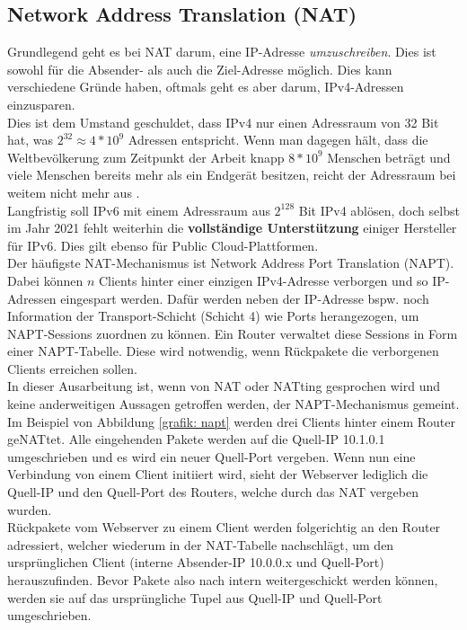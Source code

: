 \subsection{Network Address Translation (NAT)}
Grundlegend geht es bei \gls{NAT} darum, eine IP-Adresse \textit{umzuschreiben}. Dies ist sowohl für die Absender- als auch die Ziel-Adresse möglich. Dies kann verschiedene Gründe haben, oftmals geht es aber darum, IPv4-Adressen einzusparen.\\
Dies ist dem Umstand geschuldet, dass IPv4 nur einen Adressraum von 32 Bit hat, was $2^{32} \approx 4*10^9$ Adressen entspricht. Wenn man dagegen hält, dass die Weltbevölkerung zum Zeitpunkt der Arbeit knapp $8*10^9$ Menschen beträgt und viele Menschen bereits mehr als ein Endgerät besitzen, reicht der Adressraum bei weitem nicht mehr aus \cite{weltbevoelkerung2020dsw}.\\
Langfristig soll IPv6 mit einem Adressraum aus $2^{128}$ Bit IPv4 ablösen, doch selbst im Jahr 2021 fehlt weiterhin die \textbf{vollständige Unterstützung} einiger Hersteller für IPv6. Dies gilt ebenso für Public Cloud-Plattformen.\\
Der häufigste \gls{NAT}-Mechanismus ist Network Address Port Translation (NAPT). Dabei können $n$ \gls{Client}s hinter einer einzigen IPv4-Adresse \glqq verborgen\grqq{} und so IP-Adressen eingespart werden. Dafür werden neben der IP-Adresse bspw. noch Information der Transport-Schicht (Schicht 4) wie Ports herangezogen, um NAPT-Sessions zuordnen zu können. Ein Router verwaltet diese Sessions in Form einer NAPT-Tabelle. Diese wird notwendig, wenn Rückpakete die verborgenen \gls{Client}s erreichen sollen.\\
In dieser Ausarbeitung ist, wenn von \gls{NAT} oder \gls{NAT}ting gesprochen wird und keine anderweitigen Aussagen getroffen werden, der NAPT-Mechanismus gemeint.\\
Im Beispiel von Abbildung \ref{grafik: napt} werden drei \gls{Client}s hinter einem Router ge\gls{NAT}tet. Alle eingehenden Pakete werden auf die Quell-IP 10.1.0.1 umgeschrieben und es wird ein neuer Quell-Port vergeben. Wenn nun eine Verbindung von einem \gls{Client} initiiert wird, sieht der Webserver lediglich die Quell-IP und den Quell-Port des Routers, welche durch das \gls{NAT} vergeben wurden.\\
Rückpakete vom Webserver zu einem \gls{Client} werden folgerichtig an den Router adressiert, welcher wiederum in der \gls{NAT}-Tabelle nachschlägt, um den ursprünglichen \gls{Client} (interne Absender-IP 10.0.0.x und Quell-Port) herauszufinden. Bevor Pakete also nach intern weitergeschickt werden können, werden sie auf das ursprüngliche Tupel aus Quell-IP und Quell-Port umgeschrieben.\\

